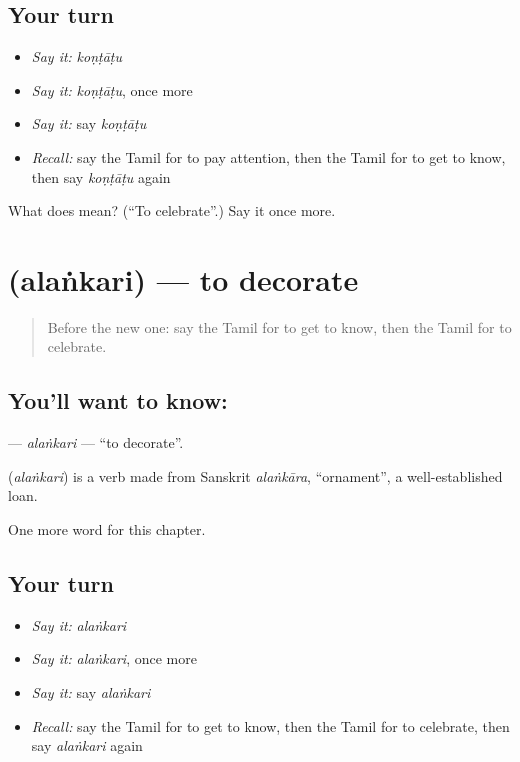 \subsection*{Your turn}
\begin{itemize}
\raggedright
  \item \emph{Say it:} \emph{koṇṭāṭu}
  \item \emph{Say it:} \emph{koṇṭāṭu}, once more
  \item \emph{Say it:} say \emph{koṇṭāṭu}
  \item \emph{Recall:} say the Tamil for to pay attention, then the Tamil for to get to know, then say \emph{koṇṭāṭu} again
\end{itemize}

\begin{tcolorbox}[breakable,colback=teal!4,colframe=teal!35!black,title={Before you move on}]
What does  mean? (\textquotedblleft{}To celebrate\textquotedblright{}.) Say it once more.
\end{tcolorbox}
\section[\texorpdfstring{\ta{அலங்கரி} (alaṅkari)}{அலங்கரி (alaṅkari)}]{ (alaṅkari) — to decorate}

\label{lesson:TA-C165-alankari}



\begin{quote}
Before the new one: say the Tamil for to get to know, then the Tamil for to celebrate.
\end{quote}

\subsection*{You'll want to know: }
\textbf{} — \emph{alaṅkari} — \textquotedblleft{}to decorate\textquotedblright{}.

\begin{cousinweb}
\textbf{} (\emph{alaṅkari}) is a verb made from Sanskrit \emph{alaṅkāra}, \textquotedblleft{}ornament\textquotedblright{}, a well-established loan.
\end{cousinweb}

\begin{grammarlens}[title={What you've built}]
One more word for this chapter.
\end{grammarlens}

\subsection*{Your turn}
\begin{itemize}
\raggedright
  \item \emph{Say it:} \emph{alaṅkari}
  \item \emph{Say it:} \emph{alaṅkari}, once more
  \item \emph{Say it:} say \emph{alaṅkari}
  \item \emph{Recall:} say the Tamil for to get to know, then the Tamil for to celebrate, then say \emph{alaṅkari} again
\end{itemize}

